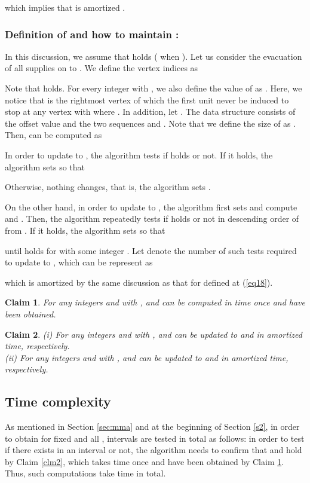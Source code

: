 \documentclass[a4paper]{llncs}
\newtheorem{clm}{Claim}
\begin{document}
which implies that  is amortized .




\subsubsection{Definition of  and how to maintain :} 
In this discussion, we assume that  holds ( when ).
Let us consider the evacuation of all supplies on  to .
We define the vertex indices  as

Note that  holds. 
For every integer  with , we also define the value of  as .
Here, we notice that  is the rightmost vertex of which the first unit never be induced to stop at any vertex  with  where .
In addition, let .
The data structure  consists of the offset value  and the two sequences  and .
Note that we define the size of  as .
Then,  can be computed as 


In order to update  to , the algorithm tests if  holds or not. 
If it holds, the algorithm sets  so that

Otherwise, nothing changes, that is, the algorithm sets .

On the other hand, in order to update  to , the algorithm first sets  and 
compute  and .
Then, the algorithm repeatedly tests if 
 holds or not in descending order of  from .
If it holds, the algorithm sets  so that

until  holds for  with some integer .
Let  denote the number of such tests required to update  to , which can be represent as

which is amortized  by the same discussion as that for  defined at (\ref{eq18}).

\begin{clm}
For any integers  and  with ,
 and  can be computed in  time once  and  have been obtained.
\label{clm:ds1}
\end{clm}
\begin{clm}
{\rm (i)} For any integers  and  with ,
 and  can be updated to  and  in amortized  time, respectively. \\
{\rm (ii)} For any integers  and  with ,
 and  can be updated to  and  in amortized  time, respectively.
\label{clm:ds2}
\end{clm}

\subsection{Time complexity}


As mentioned in Section \ref{sec:mma} and at the beginning of Section \ref{s2}, in order to obtain  for fixed  and all , 
 intervals are tested in total as follows:
in order to test if there exists  in an interval  or not, 
the algorithm needs to confirm that  and  hold by Claim \ref{clm2}, 
which takes  time once  and  have been obtained by Claim \ref{clm:ds1}.
Thus, such computations take  time in total.
\end{document}
